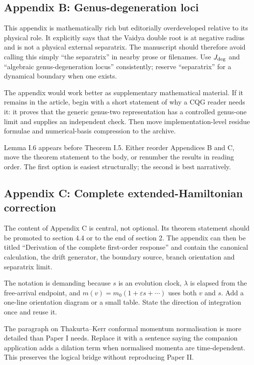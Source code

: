 \documentclass[11pt,a4paper]{article}
\begin{document}
\subsection{Appendix B: Genus-degeneration loci}

This appendix is mathematically rich but editorially overdeveloped relative to its physical role.
It explicitly says that the Vaidya double root is at negative radius and is not a physical external
separatrix.  The manuscript should therefore avoid calling this simply ``the separatrix'' in
nearby prose or filenames.  Use $J_{\rm deg}$ and ``algebraic genus-degeneration locus''
consistently; reserve ``separatrix'' for a dynamical boundary when one exists.

The appendix would work better as supplementary mathematical material.  If it remains in the
article, begin with a short statement of why a CQG reader needs it: it proves that the generic
genus-two representation has a controlled genus-one limit and supplies an independent check.
Then move implementation-level residue formulae and numerical-basis compression to the archive.

Lemma I.6 appears before Theorem I.5.  Either reorder Appendices B and C, move the theorem statement
to the body, or renumber the results in reading order.  The first option is easiest structurally;
the second is best narratively.

\subsection{Appendix C: Complete extended-Hamiltonian correction}

The content of Appendix C is central, not optional.  Its theorem statement should be promoted to
section 4.4 or to the end of section 2.  The appendix can then be titled ``Derivation of the
complete first-order response'' and contain the canonical calculation, the drift generator, the
boundary source, branch orientation and separatrix limit.

The notation is demanding because $s$ is an evolution clock, $\lambda$ is elapsed from the
free-arrival endpoint, and $m(v)=m_0(1+\varepsilon s+\cdots)$ uses both $v$ and $s$.  Add a one-line
orientation diagram or a small table.  State the direction of integration once and reuse it.

The paragraph on Thakurta--Kerr conformal momentum normalisation is more detailed than Paper I
needs.  Replace it with a sentence saying the companion application adds a dilation term when
normalised momenta are time-dependent.  This preserves the logical bridge without reproducing
Paper II.
\end{document}

